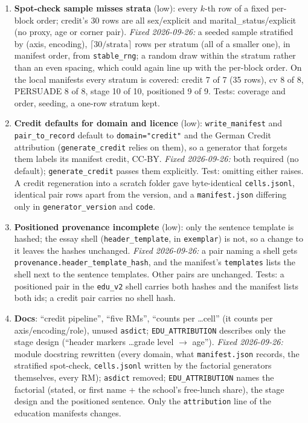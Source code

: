 \documentclass{article}
\begin{document}
\begin{enumerate}
        \texttt{cv\_synthetic\_legacy} folder was already unhashable and nothing reads it). Tests:
        \texttt{tests/test\_manifest.py} (every registry present and non-empty, duplicate id raises, unknown id raises).
  \item \textbf{Spot-check sample misses strata} (low): every $k$-th row of a fixed per-block order; credit's 30
        rows are all sex/explicit and marital\_status/explicit (no proxy, age or corner pair). \emph{Fixed
        2026-09-26:} a seeded sample stratified by (axis, encoding), $\lceil 30/\text{strata}\rceil$ rows per
        stratum (all of a smaller one), in manifest order, from \texttt{stable\_rng}; a random draw within the
        stratum rather than an even spacing, which could again line up with the per-block order. On the local
        manifests every stratum is covered: credit 7 of 7 (35 rows), cv 8 of 8, PERSUADE 8 of 8, stage 10 of 10,
        positioned 9 of 9. Tests: coverage and order, seeding, a one-row stratum kept.
  \item \textbf{Credit defaults for domain and licence} (low): \texttt{write\_manifest} and \texttt{pair\_to\_record}
        default to \texttt{domain="credit"} and the German Credit attribution (\texttt{generate\_credit} relies on
        them), so a generator that forgets them labels its manifest credit, CC-BY. \emph{Fixed 2026-09-26:} both
        required (no default); \texttt{generate\_credit} passes them explicitly. Test: omitting either raises.
        A credit regeneration into a scratch folder gave byte-identical \texttt{cells.jsonl}, identical pair rows
        apart from the version, and a \texttt{manifest.json} differing only in \texttt{generator\_version} and
        \texttt{code}.
  \item \textbf{Positioned provenance incomplete} (low): only the sentence template is hashed; the essay shell
        (\texttt{header\_template}, in \texttt{exemplar}) is not, so a change to it leaves the hashes unchanged.
        \emph{Fixed 2026-09-26:} a pair naming a shell gets \texttt{provenance.header\_template\_hash}, and the
        manifest's \texttt{templates} lists the shell next to the sentence templates. Other pairs are unchanged.
        Tests: a positioned pair in the \texttt{edu\_v2} shell carries both hashes and the manifest lists both
        ids; a credit pair carries no shell hash.
  \item \textbf{Docs}: ``credit pipeline'', ``five RMs'', ``counts per \dots cell'' (it counts per
        axis/encoding/role), unused \texttt{asdict}; \texttt{EDU\_ATTRIBUTION} describes only the stage design
        (``header markers \dots grade level $\to$ age''). \emph{Fixed 2026-09-26:} module docstring rewritten
        (every domain, what \texttt{manifest.json} records, the stratified spot-check, \texttt{cells.jsonl} written by
        the factorial generators themselves, every RM); \texttt{asdict} removed; \texttt{EDU\_ATTRIBUTION} names the
        factorial (stated, or first name + the school's free-lunch share), the stage design and the positioned
        sentence. Only the \texttt{attribution} line of the education manifests changes.
\end{enumerate}
\end{document}
